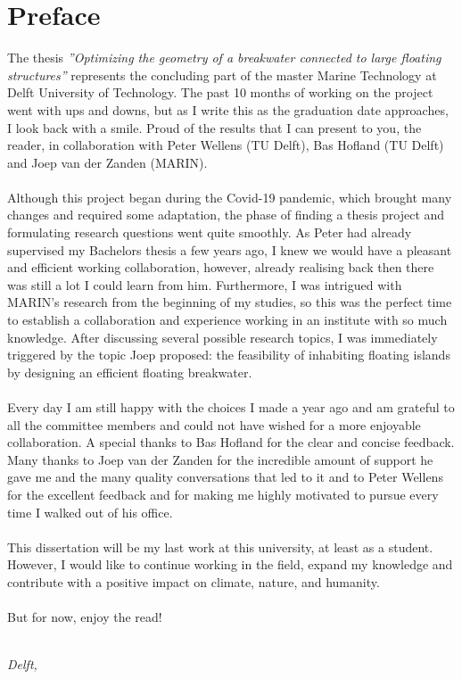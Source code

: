 \chapter*{Preface}

The thesis \textit{''Optimizing the geometry of a breakwater connected to large floating structures''} represents the concluding part of the master Marine Technology at Delft University of Technology. The past 10 months of working on the project went with ups and downs, but as I write this as the graduation date approaches, I look back with a smile. Proud of the results that I can present to you, the reader, in collaboration with Peter Wellens (TU Delft), Bas Hofland (TU Delft) and Joep van der Zanden (MARIN).\\
\\
Although this project began during the Covid-19 pandemic, which brought many changes and required some adaptation, the phase of finding a thesis project and formulating research questions went quite smoothly. As Peter had already supervised my Bachelors thesis a few years ago, I knew we would have a pleasant and efficient working collaboration, however, already realising back then there was still a lot I could learn from him. Furthermore, I was intrigued with MARIN's research from the beginning of my studies, so this was the perfect time to establish a collaboration and experience working in an institute with so much knowledge. After discussing several possible research topics, I was immediately triggered by the topic Joep proposed: the feasibility of inhabiting floating islands by designing an efficient floating breakwater.\\
\\
Every day I am still happy with the choices I made a year ago and am grateful to all the committee members and could not have wished for a more enjoyable collaboration. A special thanks to Bas Hofland for the clear and concise feedback. Many thanks to Joep van der Zanden for the incredible amount of support he gave me and the many quality conversations that led to it and to Peter Wellens for the excellent feedback and for making me highly motivated to pursue every time I walked out of his office. \\
\\
This dissertation will be my last work at this university, at least as a student. However, I would like to continue working in the field, expand my knowledge and contribute with a positive impact on climate, nature, and humanity.\\
\\

But for now, enjoy the read!


\begin{flushright}
{\makeatletter\itshape
    \ifdefvoid{\@author@short}{\@author}{\@author@short} \\
    Delft, \monthname{} \the\year{}
\makeatother}
\end{flushright}
